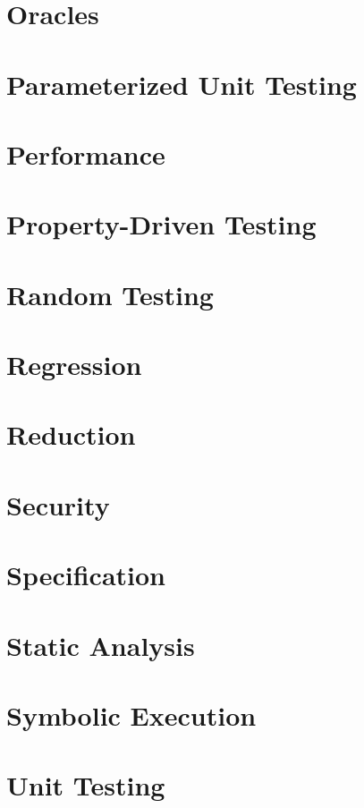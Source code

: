 \chapter{Oracles}

\chapter{Parameterized Unit Testing}

\chapter{Performance}

\chapter{Property-Driven Testing}

\chapter{Random Testing}

\chapter{Regression}

\chapter{Reduction}

\chapter{Security}

\chapter{Specification}

\chapter{Static Analysis}

\chapter{Symbolic Execution}

\chapter{Unit Testing}

